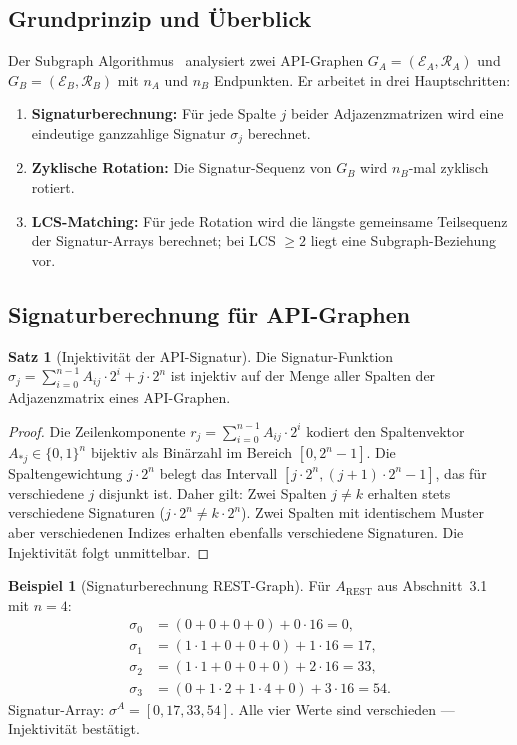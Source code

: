 ﻿\documentclass[a4paper,12pt]{article}
\theoremstyle{definition}
\newtheorem{beispiel}{Beispiel}
\newtheorem{satz}{Satz}
\begin{document}
\subsection{Grundprinzip und Überblick}

Der Subgraph Algorithmus~\cite{epp2026} analysiert zwei API-Graphen
$G_A = (\mathcal{E}_A, \mathcal{R}_A)$ und $G_B = (\mathcal{E}_B, \mathcal{R}_B)$
mit $n_A$ und $n_B$ Endpunkten. Er arbeitet in drei Hauptschritten:

\begin{enumerate}
  \item \textbf{Signaturberechnung:} Für jede Spalte $j$ beider Adjazenzmatrizen
    wird eine eindeutige ganzzahlige Signatur $\sigma_j$ berechnet.
  \item \textbf{Zyklische Rotation:} Die Signatur-Sequenz von $G_B$ wird $n_B$-mal
    zyklisch rotiert.
  \item \textbf{LCS-Matching:} Für jede Rotation wird die längste gemeinsame
    Teilsequenz der Signatur-Arrays berechnet; bei LCS $\geq 2$ liegt eine
    Subgraph-Beziehung vor.
\end{enumerate}

\subsection{Signaturberechnung für API-Graphen}

\begin{satz}[Injektivität der API-Signatur]
  \label{satz:injektiv}
  Die Signatur-Funktion $\sigma_j = \sum_{i=0}^{n-1} A_{ij} \cdot 2^i + j \cdot 2^n$
  ist injektiv auf der Menge aller Spalten der Adjazenzmatrix eines API-Graphen.
\end{satz}

\begin{proof}
  Die Zeilenkomponente $r_j = \sum_{i=0}^{n-1} A_{ij} \cdot 2^i$ kodiert den
  Spaltenvektor $A_{*j} \in \{0,1\}^n$ bijektiv als Binärzahl im Bereich
  $[0, 2^n - 1]$. Die Spaltengewichtung $j \cdot 2^n$ belegt das Intervall
  $[j \cdot 2^n, (j+1) \cdot 2^n - 1]$, das für verschiedene $j$ disjunkt ist.
  Daher gilt: Zwei Spalten $j \neq k$ erhalten stets verschiedene Signaturen
  ($j \cdot 2^n \neq k \cdot 2^n$). Zwei Spalten mit identischem Muster aber
  verschiedenen Indizes erhalten ebenfalls verschiedene Signaturen.
  Die Injektivität folgt unmittelbar.
\end{proof}

\begin{beispiel}[Signaturberechnung REST-Graph]
  Für $A_{\mathrm{REST}}$ aus Abschnitt~3.1 mit $n=4$:
  \begin{align*}
    \sigma_0 &= (0+0+0+0) + 0 \cdot 16 = 0, \\
    \sigma_1 &= (1 \cdot 1 + 0 + 0 + 0) + 1 \cdot 16 = 17, \\
    \sigma_2 &= (1 \cdot 1 + 0 + 0 + 0) + 2 \cdot 16 = 33, \\
    \sigma_3 &= (0 + 1 \cdot 2 + 1 \cdot 4 + 0) + 3 \cdot 16 = 54.
  \end{align*}
  Signatur-Array: $\sigma^A = [0, 17, 33, 54]$.
  Alle vier Werte sind verschieden --- Injektivität bestätigt.
\end{beispiel}
\end{document}
